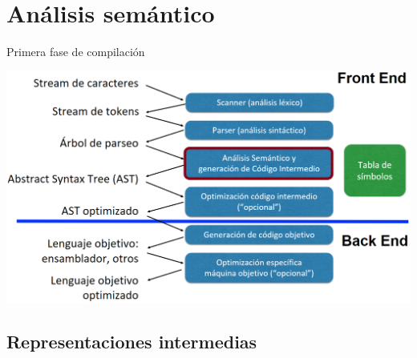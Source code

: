 \documentclass[handout]{beamer} %
\begin{document}

\section{Análisis semántico}

\begin{frame}{Primera fase de compilación}
    \begin{center}
    \includegraphics[width=\textwidth]{./image/cap3/compilador-fase3}
    \end{center}
\end{frame}

\subsection{Representaciones intermedias}
\end{document}
